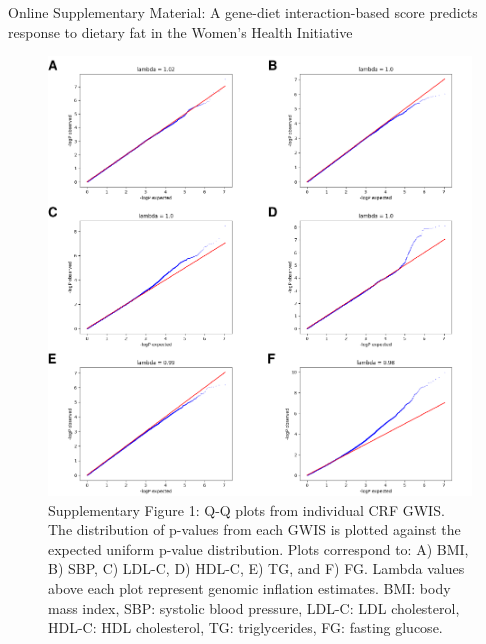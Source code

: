 \documentclass[]{article}
\begin{document}
\newpage
Online Supplementary Material: A gene-diet interaction-based score
predicts response to dietary fat in the Women's Health Initiative

\begin{figure}[H]
\centering
\includegraphics{figures/show-qq-plots-1.pdf}
\caption{Supplementary Figure 1: Q-Q plots from individual CRF GWIS. The distribution of
p-values from each GWIS is plotted against the expected uniform p-value
distribution. Plots correspond to: A) BMI, B) SBP, C) LDL-C, D) HDL-C,
E) TG, and F) FG. Lambda values above each plot represent genomic
inflation estimates. BMI: body mass index, SBP: systolic blood pressure,
LDL-C: LDL cholesterol, HDL-C: HDL cholesterol, TG: triglycerides, FG:
fasting glucose.}
\end{figure}
\end{document}
